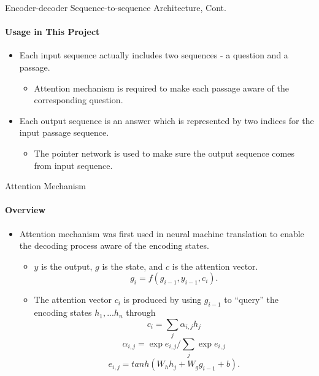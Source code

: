 \documentclass{beamer}
\begin{document}
\begin{frame}{Encoder-decoder Sequence-to-sequence Architecture, Cont.}\framesubtitle{Usage in This Project}
    \begin{itemize}
        \item Each input sequence actually includes two sequences - a question and a passage.
            \begin{itemize}
                \item Attention mechanism is required to make each passage aware of the corresponding question.
            \end{itemize}
        \item Each output sequence is an answer which is represented by two indices for the input passage sequence.
            \begin{itemize}
                \item The pointer network is used to make sure the output sequence comes from input sequence.
            \end{itemize}
    \end{itemize}
\end{frame}

\begin{frame}{Attention Mechanism}\framesubtitle{Overview}
    \begin{itemize}
        \item Attention mechanism was first used in neural machine translation to enable the decoding process aware of the encoding states.
        \begin{itemize}
            \item $y$ is the output, $g$ is the state, and $c$ is the attention vector. $$g_i =f(g_{i-1},y_{i-1},c_i).$$
            \item The attention vector $c_i$ is produced by using $g_{i-1}$ to ``query'' the encoding states $h_1, ... h_n$ through
        $$c_i = \sum _j {\alpha _{i,j} h_j}$$
        $$\alpha _{i,j} = \exp{e_{i,j}} / \sum _j {\exp{e_{i,j}}}$$
        $$e_{i,j} = tanh(W_h h_j + W_g g_{i-1} + b).$$
        \end{itemize}
    \end{itemize}
\end{frame}
\end{document}
